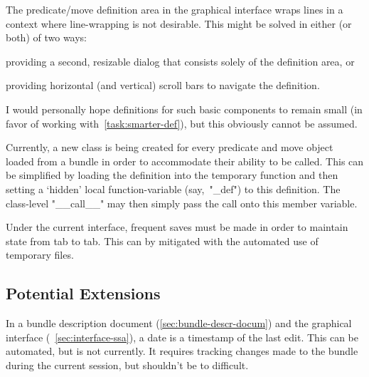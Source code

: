 \begin{task}
  \label{task:gui-definition-wrapping}
  The predicate\slash move definition area in the graphical interface
    wraps lines in a context where line-wrapping is not desirable.
  This might be solved in either (or both) of two ways:
  \begin{itemize*}
  \item providing a second, resizable dialog that consists solely of the definition area, or
  \item providing horizontal (and vertical) scroll bars to navigate the definition.
  \end{itemize*}
  I would personally hope definitions for such basic components to remain small
    (in favor of working with~\autoref{task:smarter-def}),
    but this obviously cannot be assumed.
\end{task}

\begin{task}
  \label{task:smarter-def}
  Currently, a new class is being created for every predicate and move
  object loaded from a bundle in order to accommodate their ability to
  be called.  This can be simplified by loading the definition into
  the temporary function and then setting a \enquote*{hidden} local
  function-variable (say,~"_def") to this definition.  The
  class-level "__call__" may then simply pass the call onto this
  member variable.
\end{task}

\begin{task}
  \label{task:temp-files}
  Under the current interface, frequent saves must be made in order to
  maintain state from tab to tab.  This can by mitigated with the
  automated use of temporary files.
\end{task}


\subsection{Potential Extensions}
\label{sec:tasks:ext}

\begin{task}
  \label{tast:autodate}
  In a bundle description document (\autoref{sec:bundle-descr-docum})
    and the graphical interface (~\autoref{sec:interface-ssa}),
    a date is a timestamp of the last edit.
  This can be automated, but is not currently.
  It requires tracking changes made to the bundle during the current session,
    but shouldn't be to difficult.
\end{task}

